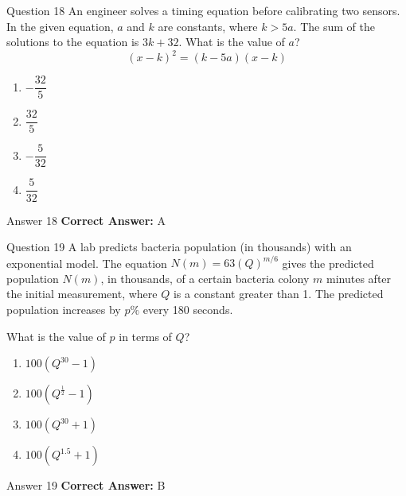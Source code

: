 \documentclass{beamer}
\begin{document}
\begin{frame}{Question 18}
\small
An engineer solves a timing equation before calibrating two sensors. In the given equation, \(a\) and \(k\) are constants, where \(k > 5a\). The sum of the solutions to the equation is \(3k + 32\). What is the value of \(a\)?
\[
(x - k)^2 = (k - 5a)(x - k)
\]
\vspace{0.35cm}
\begin{enumerate}
    \item[A.] \(-\dfrac{32}{5}\)
    \item[B.] \(\dfrac{32}{5}\)
    \item[C.] \(-\dfrac{5}{32}\)
    \item[D.] \(\dfrac{5}{32}\)
\end{enumerate}
\end{frame}
\begin{frame}{Answer 18}
\small
\textbf{Correct Answer:} A
\end{frame}

\begin{frame}{Question 19}
\small
A lab predicts bacteria population (in thousands) with an exponential model. The equation \(N(m) = 63(Q)^{m/6}\) gives the predicted population \(N(m)\), in thousands, of a certain bacteria colony \(m\) minutes after the initial measurement, where \(Q\) is a constant greater than 1. The predicted population increases by \(p\%\) every 180 seconds.

What is the value of \(p\) in terms of \(Q\)?
\vspace{0.35cm}
\begin{enumerate}
    \item[A.] \(100(Q^{30} - 1)\)
    \item[B.] \(100(Q^{\frac{1}{2}} - 1)\)
    \item[C.] \(100(Q^{30} + 1)\)
    \item[D.] \(100(Q^{1.5} + 1)\)
\end{enumerate}
\end{frame}
\begin{frame}{Answer 19}
\small
\textbf{Correct Answer:} B
\end{frame}
\end{document}
